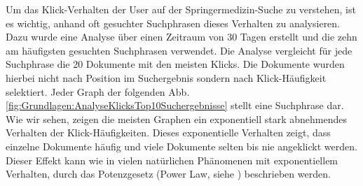 
Um das Klick-Verhalten der User auf der Springermedizin-Suche zu verstehen, ist es wichtig, anhand oft gesuchter Suchphrasen dieses Verhalten zu analysieren. Dazu wurde eine Analyse über einen Zeitraum von 30 Tagen erstellt und die zehn am häufigsten gesuchten Suchphrasen verwendet. Die Analyse vergleicht für jede Suchphrase die 20 Dokumente mit den meisten Klicks. Die Dokumente wurden hierbei nicht nach Position im Suchergebnis sondern nach Klick-Häufigkeit selektiert. Jeder Graph der folgenden Abb. \ref{fig:Grundlagen:AnalyseKlicksTop10Suchergebnisse} stellt eine Suchphrase dar. Wie wir sehen, zeigen die meisten Graphen ein exponentiell stark abnehmendes Verhalten der Klick-Häufigkeiten. Dieses exponentielle Verhalten zeigt, dass einzelne Dokumente häufig und viele Dokumente selten bis nie angeklickt werden. Dieser Effekt kann wie in vielen natürlichen Phänomenen mit exponentiellem Verhalten, durch das Potenzgesetz (Power Law, siehe \cite{PowerLaw}) beschrieben werden. 

